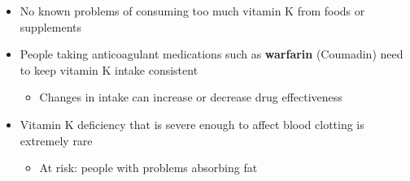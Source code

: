 \documentclass[12pt]{article}
\begin{document}
\begin{itemize}
\begin{itemize}
                        \item No known problems of consuming too much vitamin K from foods or supplements
                        \item People taking anticoagulant medications such as \textbf{warfarin} (Coumadin) need to keep vitamin K intake consistent
                            \begin{itemize}
                                \item Changes in intake can increase or decrease drug effectiveness
                            \end{itemize}
                        \item Vitamin K deficiency that is severe enough to affect blood clotting is extremely rare
                            \begin{itemize}
                                \item At risk: people with problems absorbing fat
                            \end{itemize}
                    \end{itemize}
            \end{itemize}
\end{document}
